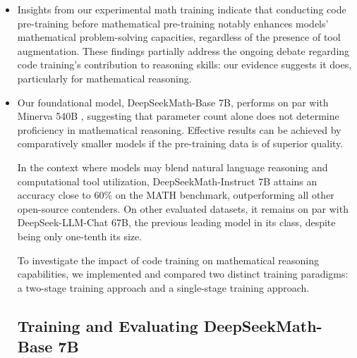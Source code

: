 \begin{itemize}[topsep=0pt]
In this expression, $r_\varphi$ stands for the reward model, and $\pi_{ref}$ represents the reference model (typically the initial SFT model), while $\beta$ acts as the weighting coefficient for the KL penalty.

    \item Insights from our experimental math training indicate that conducting code pre-training before mathematical pre-training notably enhances models' mathematical problem-solving capacities, regardless of the presence of tool augmentation. These findings partially address the ongoing debate regarding code training’s contribution to reasoning skills: our evidence suggests it does, particularly for mathematical reasoning.

    \item Our foundational model, DeepSeekMath-Base 7B, performs on par with Minerva 540B \citep{minerva}, suggesting that parameter count alone does not determine proficiency in mathematical reasoning. Effective results can be achieved by comparatively smaller models if the pre-training data is of superior quality.

In the context where models may blend natural language reasoning and computational tool utilization, DeepSeekMath-Instruct 7B attains an accuracy close to 60\% on the MATH benchmark, outperforming all other open-source contenders. On other evaluated datasets, it remains on par with DeepSeek-LLM-Chat 67B, the previous leading model in its class, despite being only one-tenth its size.

To investigate the impact of code training on mathematical reasoning capabilities, we implemented and compared two distinct training paradigms: a two-stage training approach and a single-stage training approach.

\subsection{Training and Evaluating DeepSeekMath-Base 7B}


\end{itemize}
